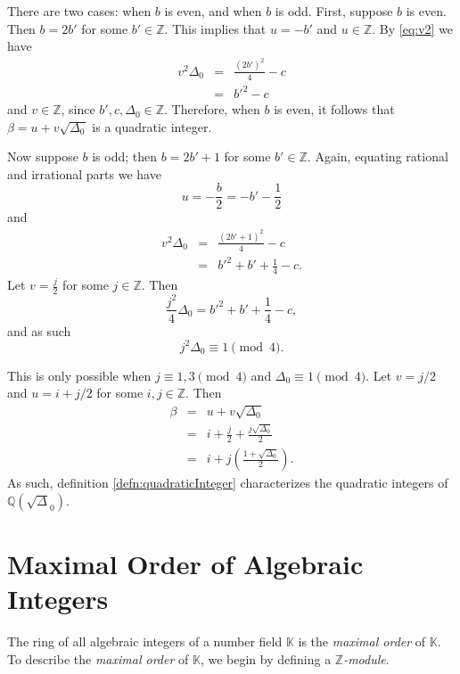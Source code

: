 \documentclass{ucalgthes1}
\theoremstyle{plain}
\theoremstyle{definition}
\newcommand{\KK}{\mathbb{K}}
\newcommand{\ZZ}{\mathbb{Z}}
\newcommand{\QQ}{\mathbb{Q}}
\begin{document}
There are two cases: when $b$ is even, and when $b$ is odd.  First, suppose $b$ is even.  Then $b=2b'$ for some $b' \in \ZZ$.  This implies that $u = -b'$ and $u \in \ZZ$.  By \eqref{eq:v2} we have
\begin{eqnarray*}
	v^2 \Delta_0 & = & \frac{(2b')^2}{4} - c \\
	& = & b'^2 - c
\end{eqnarray*}
and $v \in \ZZ$, since $b', c, \Delta_0 \in \ZZ$.  Therefore, when $b$ is even, it follows that $\beta = u + v \sqrt{\Delta_0}$ is a quadratic integer.

\bigbreak
Now suppose $b$ is odd; then $b=2b' + 1$ for some $b' \in \ZZ$.  Again, equating rational and irrational parts we have
\[
	u = - \frac{b}{2} = -b' - \frac{1}{2}
\]
and
\begin{eqnarray*}
	v^2 \Delta_0 & = & \frac{(2b'+1)^2}{4} - c \\
	& = & b'^2 + b' + \frac{1}{4} -c.
\end{eqnarray*}
Let $v = \frac{j}{2}$ for some $j \in \ZZ$.  Then
\begin{equation*}
	\frac{j^2}{4} \Delta_0 = b'^2 + b' + \frac{1}{4} -c,
\end{equation*}
and as such
\begin{equation*}
	j^2 \Delta_0 \equiv 1 \pmod 4.
\end{equation*}

\noindent
This is only possible when $j \equiv 1,3 \pmod 4$ and $\Delta_0 \equiv 1 \pmod 4$.  Let $v = j/2$ and $u = i + j/2$ for some $i, j \in \ZZ$.  Then
\begin{eqnarray*}
	\beta & = & u + v \sqrt{\Delta_0} \\
	& = & i + \frac{j}{2} + \frac{j \sqrt{\Delta_0}}{2} \\
	& = & i + j \left( \frac{1 + \sqrt{\Delta_0}}{2} \right).
\end{eqnarray*}
As such, definition \ref{defn:quadraticInteger} characterizes the quadratic integers of $\QQ(\sqrt\Delta_0)$.



\bigbreak
\section{Maximal Order of Algebraic Integers}
The ring of all algebraic integers of a number field $\KK$ is the \emph{maximal order} of $\KK$.  To describe the \emph{maximal order} of $\KK$, we begin by defining a \emph{$\ZZ$-module}.  
\end{document}
